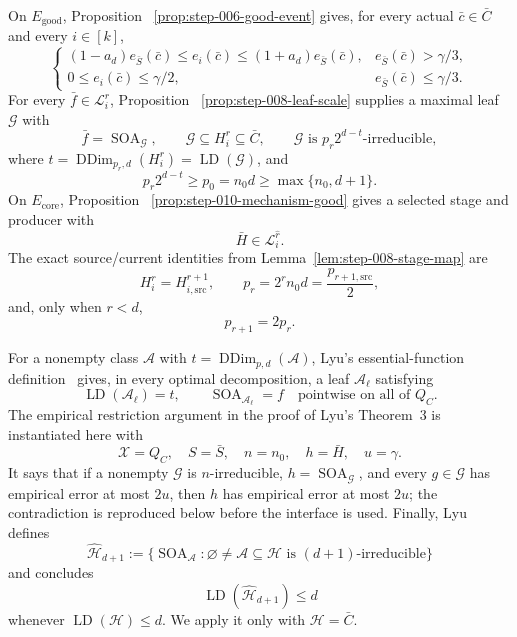 On \(E_{\mathrm{good}}\), Proposition
~\ref{prop:step-006-good-event} gives, for every actual
\(\bar c\in\bar C\) and every \(i\in[k]\),
\[
\begin{cases}
 (1-a_d)e_{\bar S}(\bar c)
       \leq e_i(\bar c)
       \leq(1+a_d)e_{\bar S}(\bar c),
       &e_{\bar S}(\bar c)>\gamma/3,\\
 0\leq e_i(\bar c)\leq\gamma/2,
       &e_{\bar S}(\bar c)\leq\gamma/3.
\end{cases}
\tag{8}
\]
For every \(\bar f\in\mathcal L_i^r\), Proposition
~\ref{prop:step-008-leaf-scale} supplies a maximal leaf \(\mathcal G\)
with
\[
 \bar f=\operatorname{SOA}_{\mathcal G},
 \qquad
 \mathcal G\subseteq H_i^r\subseteq\bar C,
 \qquad
 \mathcal G\text{ is }p_r2^{d-t}\text{-irreducible},
\tag{9}
\]
where
\(t=\operatorname{DDim}_{p_r,d}(H_i^r)
   =\operatorname{LD}(\mathcal G)\), and
\[
 p_r2^{d-t}\geq p_0=n_0d\geq\max\{n_0,d+1\}.
\tag{10}
\]
On \(E_{\mathrm{core}}\), Proposition
~\ref{prop:step-010-mechanism-good} gives a selected stage and producer
with
\[
 \bar H\in\mathcal L_i^{\widehat r}.
\tag{11}
\]
The exact source/current identities from
Lemma~\ref{lem:step-008-stage-map} are
\[
 H_i^r=H_{i,\mathrm{src}}^{r+1},
 \qquad
 p_r=2^rn_0d=\frac{p_{r+1,\mathrm{src}}}{2},
\tag{12}
\]
and, only when \(r<d\),
\[
 p_{r+1}=2p_r.
\tag{13}
\]

For a nonempty class \(\mathcal A\) with
\(t=\operatorname{DDim}_{p,d}(\mathcal A)\), Lyu's essential-function
definition~\citep{lyu2025} gives, in every optimal decomposition, a leaf
\(\mathcal A_\ell\) satisfying
\[
 \operatorname{LD}(\mathcal A_\ell)=t,
 \qquad
 \operatorname{SOA}_{\mathcal A_\ell}=f
 \quad\text{pointwise on all of }Q_C.
\tag{14}
\]
The empirical restriction argument in the proof of Lyu's Theorem~3 is
instantiated here with
\[
 \mathcal X=Q_C,
 \quad S=\bar S,
 \quad n=n_0,
 \quad h=\bar H,
 \quad u=\gamma.
\tag{15}
\]
It says that if a nonempty \(\mathcal G\) is \(n\)-irreducible,
\(h=\operatorname{SOA}_{\mathcal G}\), and every \(g\in\mathcal G\)
has empirical error at most \(2u\), then \(h\) has empirical error at
most \(2u\); the contradiction is reproduced below before the interface is
used. Finally, Lyu~\citep[Lemma~4.2]{lyu2025} defines
\[
 \widehat{\mathcal H}_{d+1}
 :=\{\operatorname{SOA}_{\mathcal A}:
       \varnothing\ne\mathcal A\subseteq\mathcal H
       \text{ is }(d+1)\text{-irreducible}\}
\tag{16}
\]
and concludes
\[
 \operatorname{LD}(\widehat{\mathcal H}_{d+1})\leq d
\tag{17}
\]
whenever \(\operatorname{LD}(\mathcal H)\leq d\).  We apply it only with
\(\mathcal H=\bar C\).

